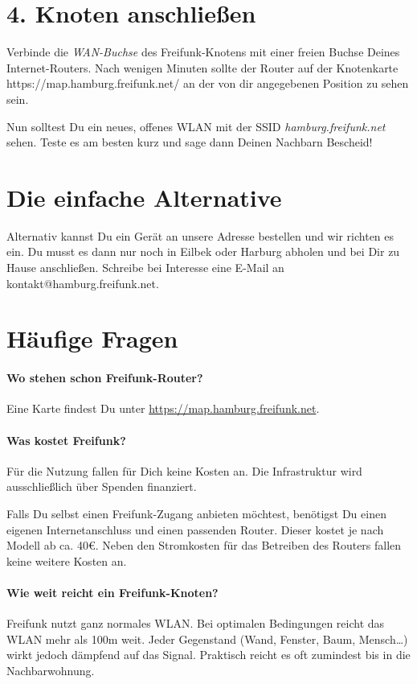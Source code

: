 \documentclass[10pt,a4paper,notumble]{leaflet}
\begin{document}
\section{4. Knoten anschließen}
Verbinde die \textit{WAN-Buchse} des Freifunk-Knotens mit einer freien Buchse Deines Internet-Routers. Nach wenigen Minuten sollte der Router auf der Knotenkarte \mbox{https://map.hamburg.freifunk.net/} an der von dir angegebenen Position zu sehen sein.

Nun solltest Du ein neues, offenes WLAN mit der SSID \mbox{\textit{hamburg.freifunk.net}} sehen. Teste es am besten kurz und sage dann Deinen Nachbarn Bescheid!

\section{Die einfache Alternative}
Alternativ kannst Du ein Gerät an unsere Adresse bestellen und wir richten es ein. Du musst es dann nur noch in Eilbek oder Harburg abholen und bei Dir zu Hause anschließen. Schreibe bei Interesse eine \mbox{E-Mail} an \mbox{kontakt@hamburg.freifunk.net}.

\newpage
\section{Häufige Fragen}
\setlength{\parskip}{0.1em}
\paragraph{Wo stehen schon Freifunk-Router?} Eine Karte findest Du unter \mbox{\href{https://map.hamburg.freifunk.net}{https://map.hamburg.freifunk.net}}.

\paragraph{Was kostet Freifunk?}
Für die Nutzung fallen für Dich keine Kosten an. Die Infrastruktur wird ausschließlich über Spenden finanziert.

Falls Du selbst einen Freifunk-Zugang anbieten möchtest, benötigst Du einen eigenen Internetanschluss und einen passenden Router. Dieser kostet je nach Modell ab ca. 40€.  Neben den Stromkosten für das Betreiben des Routers fallen keine weitere Kosten an.

\paragraph{Wie weit reicht ein Freifunk-Knoten?} Freifunk nutzt ganz normales WLAN. Bei optimalen Bedingungen reicht das WLAN mehr als 100m weit. Jeder Gegenstand (Wand, Fenster, Baum, Mensch…) wirkt jedoch dämpfend auf das Signal. Praktisch reicht es oft zumindest bis in die Nachbarwohnung.
\end{document}

